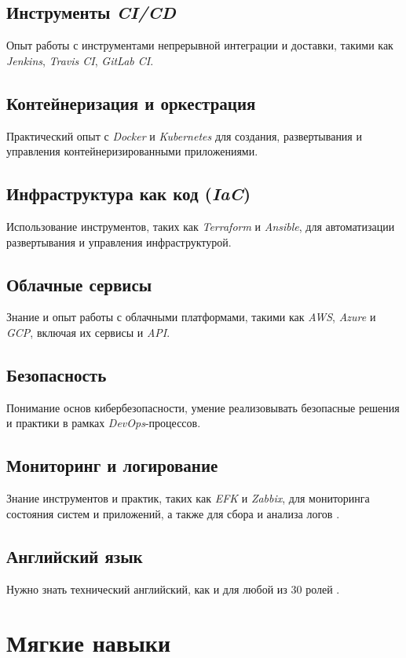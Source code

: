 \documentclass[variant=practice]{bsuir}
\begin{document}
\subsection{Инструменты \textit{CI/CD}} Опыт работы с инструментами непрерывной
интеграции и доставки, такими как \textit{Jenkins}, \textit{Travis CI},
\textit{GitLab CI}.

\subsection{Контейнеризация и оркестрация} Практический опыт с \textit{Docker} и
\textit{Kubernetes} для создания, развертывания и управления
контейнеризированными приложениями.

\subsection{Инфраструктура как код (\textit{IaC})} Использование инструментов,
таких как \textit{Terraform} и \textit{Ansible}, для автоматизации развертывания
и управления инфраструктурой.

\subsection{Облачные сервисы} Знание и опыт работы с облачными платформами,
такими как \textit{AWS}, \textit{Azure} и \textit{GCP}, включая их сервисы и
\textit{API}.

\subsection{Безопасность} Понимание основ кибербезопасности, умение
реализовывать безопасные решения и практики в рамках \textit{DevOps}-процессов.

\subsection{Мониторинг и логирование} Знание инструментов и практик, таких как
\textit{EFK} и \textit{Zabbix}, для мониторинга состояния систем и приложений, а
также для сбора и анализа логов \cite{devops-mts}.

\subsection{Английский язык} Нужно знать технический английский, как и для любой
из 30 ролей \cite{devops-mts}.

\section{Мягкие навыки}
\end{document}
